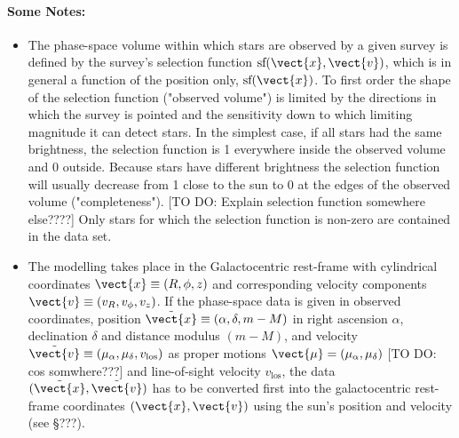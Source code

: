 \paragraph{Some Notes:}  
\begin{itemize}
\item The phase-space volume within which stars are observed by a given survey is defined by the survey's selection function $\text{sf}(\vect{x},\vect{v})$, which is in general a function of the position only, $\text{sf}(\vect{x})$. To first order the shape of the selection function ("observed volume") is limited by the directions in which the survey is pointed and the sensitivity down to which limiting magnitude it can detect stars. In the simplest case, if all stars had the same brightness, the selection function is 1 everywhere inside the observed volume and 0 outside. Because stars have different brightness the selection function will usually decrease from 1 close to the sun to 0 at the edges of the observed volume ("completeness"). [TO DO: Explain selection function somewhere else????]  Only stars for which the selection function is non-zero are contained in the data set.
\item The modelling takes place in the Galactocentric rest-frame with cylindrical coordinates $\vect{x} \equiv (R,\phi,z)$ and corresponding velocity components $\vect{v} \equiv (v_R,v_\phi,v_z)$. If the phase-space data is given in observed coordinates, position $\tilde{\vect{x}} \equiv(\alpha,\delta,m-M)$ in right ascension $\alpha$, declination $\delta$ and distance modulus $(m-M)$, and velocity $\tilde{\vect{v}} \equiv (\mu_\alpha,\mu_\delta,v_\text{los})$ as proper motions $\vect{\mu}=(\mu_\alpha,\mu_\delta)$ [TO DO: cos somwhere???] and line-of-sight velocity $v_\text{los}$, the data $(\tilde{\vect{x}},\tilde{\vect{v}})$ has to be converted first into the galactocentric rest-frame coordinates $(\vect{x},\vect{v})$ using the sun's position and velocity (see \S ???).
\end{itemize}